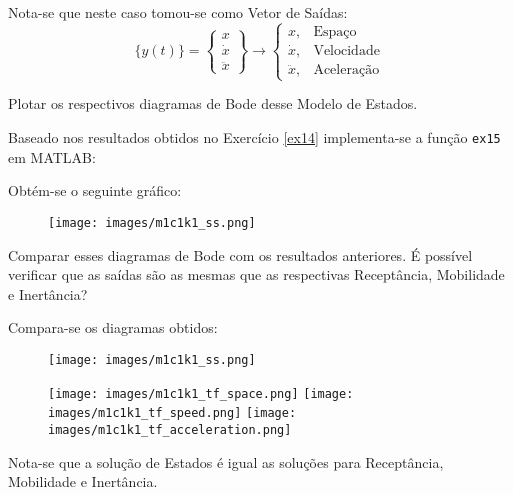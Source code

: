 \documentclass{article}
\begin{document}
\begin{resolution}
\begin{equation*}
    \end{equation*}
    Nota-se que neste caso tomou-se como Vetor de Saídas:
    \begin{equation*}
        \lbrace y(t) \rbrace = \begin{Bmatrix} x\\ \dot{x}\\ \ddot{x} \end{Bmatrix} 
        \to \begin{cases} x, &\text{Espaço}\\ \dot{x},&\text{Velocidade}\\ \ddot{x},&\text{Aceleração} \end{cases}
    \end{equation*}
\end{resolution}

\newpage
\begin{exercise}\label{ex15}
    Plotar os respectivos diagramas de Bode desse Modelo de Estados.
\end{exercise}
\begin{resolution}
    Baseado nos resultados obtidos no Exercício \ref{ex14} implementa-se a função \texttt{ex15} em MATLAB:
    \begin{scriptsize}
        \myMatlab
    \end{scriptsize}
    Obtém-se o seguinte gráfico:
    \begin{figure}[H]
        \centering
        \texttt{[image: images/m1c1k1\_ss.png]}
    \end{figure}
\end{resolution}

\newpage
\begin{exercise}\label{ex16}
    Comparar esses diagramas de Bode com os resultados anteriores. É possível verificar que as saídas são as mesmas que as respectivas Receptância, Mobilidade e Inertância?
\end{exercise}
\begin{resolution}
    Compara-se os diagramas obtidos:
    \begin{figure}[H]
        \centering
        \texttt{[image: images/m1c1k1\_ss.png]}
    \end{figure}
    \begin{figure}[H]
        \centering
        \texttt{[image: images/m1c1k1\_tf\_space.png]}
        \texttt{[image: images/m1c1k1\_tf\_speed.png]}
        \texttt{[image: images/m1c1k1\_tf\_acceleration.png]}
    \end{figure}
    Nota-se que a solução de Estados é igual as soluções para Receptância, Mobilidade e Inertância.
\end{resolution}
\end{document}
